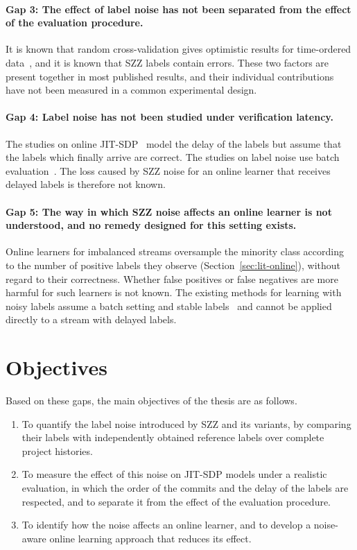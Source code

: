 \documentclass[12pt,a4paper,oneside]{report}
\begin{document}
\paragraph{Gap 3: The effect of label noise has not been separated from the effect
of the evaluation procedure.} It is known that random cross-validation gives
optimistic results for time-ordered
data~\cite{falessi2020order,tan2015online}, and it is known that SZZ labels
contain errors. These two factors are present together in most published
results, and their individual contributions have not been measured in a
common experimental design.

\paragraph{Gap 4: Label noise has not been studied under verification latency.}
The studies on online JIT-SDP~\cite{cabral2019orb,cabral2023reliable} model
the delay of the labels but assume that the labels which finally arrive are
correct. The studies on label noise use batch
evaluation~\cite{kim2011noise,fan2021mislabeled}. The loss caused by SZZ
noise for an online learner that receives delayed labels is therefore not
known.

\paragraph{Gap 5: The way in which SZZ noise affects an online learner is not
understood, and no remedy designed for this setting exists.} Online learners
for imbalanced streams oversample the minority class according to the number
of positive labels they observe (Section~\ref{sec:lit-online}), without
regard to their correctness. Whether false positives or false negatives are
more harmful for such learners is not known. The existing methods for
learning with noisy labels assume a batch setting and stable
labels~\cite{natarajan2013noisy,northcutt2021confident} and cannot be applied
directly to a stream with delayed labels.

\section{Objectives}

Based on these gaps, the main objectives of the thesis are as follows.

\begin{enumerate}[leftmargin=*]
\item To quantify the label noise introduced by SZZ and its variants, by
comparing their labels with independently obtained reference labels over
complete project histories.
\item To measure the effect of this noise on JIT-SDP models under a realistic
evaluation, in which the order of the commits and the delay of the labels are
respected, and to separate it from the effect of the evaluation procedure.
\item To identify how the noise affects an online learner, and to develop a
noise-aware online learning approach that reduces its effect.
\end{enumerate}
\end{document}
